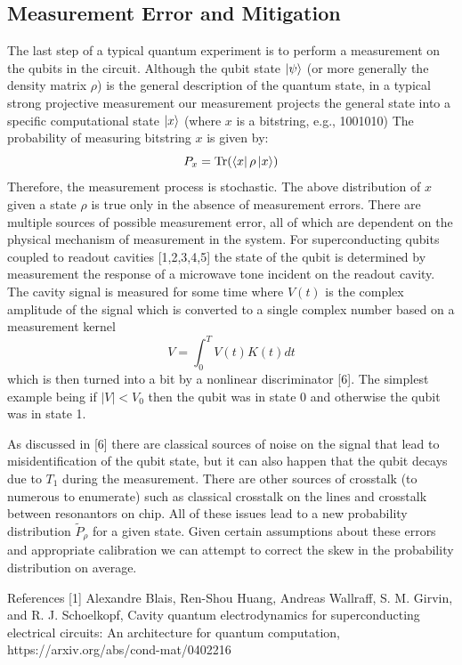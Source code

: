 \documentclass[11pt, oneside]{article}   	%
\begin{document}
\subsection{Measurement Error and Mitigation}
The last step of a typical quantum experiment is to perform a measurement on the qubits in the circuit. 
Although the qubit state $\ket{\psi}$ (or more generally the density matrix $\rho$) is the general description of the quantum state, in a typical strong projective measurement our measurement projects the general state into a specific computational state $\ket{x}$ (where $x$ is a bitstring, e.g.,  1001010) The probability of measuring bitstring $x$ is given by: 
\begin{equation}
P_x = \mathrm{Tr}(\bra{x} \rho \ket{x})
\end{equation}
Therefore, the measurement process is stochastic. 
The above distribution of $x$ given a state $\rho$ is true only in the absence of measurement errors. 
There are multiple sources of possible measurement error, all of which are dependent on the physical mechanism of measurement in the system. 
For superconducting qubits coupled to readout cavities [1,2,3,4,5] the state of the qubit is determined by measurement the response of a microwave tone incident on the readout cavity. The cavity signal is measured for some time where $V(t)$ is the complex amplitude of the signal which is converted to a single complex number based on a measurement kernel 
\begin{equation}
V = \int_0^{T} V(t) K(t) dt
\end{equation}
which is then turned into a bit by a nonlinear discriminator [6]. 
The simplest example being if $|V| < V_0$ then the qubit was in state 0 and otherwise the qubit was in state 1.

As discussed in [6] there are classical sources of noise on the signal that lead to misidentification of the qubit state, but it can also happen that the qubit decays due to $T_1$ during the measurement. There are other sources of crosstalk (to numerous to enumerate) such as classical crosstalk on the lines and crosstalk between resonantors on chip. All of these issues lead to a new probability distribution $\tilde{P}_{\rho}$ for a given state. Given certain assumptions about these errors and appropriate calibration we can attempt to correct the skew in the probability distribution on average.

References
[1] Alexandre Blais, Ren-Shou Huang, Andreas Wallraff, S. M. Girvin, and R. J. Schoelkopf, Cavity quantum electrodynamics for superconducting electrical circuits: An architecture for quantum computation, https://arxiv.org/abs/cond-mat/0402216
\end{document}
